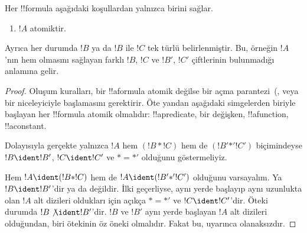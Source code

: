\begin{prop}
Her !!{formula} aşağıdaki koşullardan yalnızca birini sağlar.
\begin{enumerate}
\item $!A$ atomiktir.







\end{enumerate}
Ayrıca her durumda $!B$ ya da $!B$ ile $!C$ tek türlü belirlenmiştir.
Bu, örneğin $!A$'nın hem
 {
     {
      }}
olmasını sağlayan farklı $!B$, $!C$ ve $!B'$, $!C'$ çiftlerinin
bulunmadığı anlamına gelir.
\end{prop}

\begin{proof}
Oluşum kuralları, bir !!a{formula} atomik değilse bir açma
parantezi~(,  veya bir niceleyiciyle başlamasını
gerektirir. Öte yandan aşağıdaki simgelerden biriyle başlayan her
!!{formula} atomik olmalıdır: !!a{predicate}, bir değişken,
!!a{function}, !!a{constant}.

Dolayısıyla gerçekte yalnızca $!A$ hem $(!B \ast !C)$ hem de $(!B'
\mathbin{\ast'} !C')$ biçimindeyse $!B \ident !B'$, $!C \ident !C'$ ve
$\ast = {\ast'}$ olduğunu göstermeliyiz.

Hem $!A \ident (!B \ast !C)$ hem de $!A \ident (!B'
\mathbin{\ast'} !C')$ olduğunu varsayalım. Ya $!B \ident !B'$'dir ya
da değildir. İlki geçerliyse, aynı yerde başlayıp aynı uzunlukta olan
$!A$ alt dizileri oldukları için açıkça $\ast = {\ast'}$ ve
$!C \ident !C'$'dir. Öteki durumda $!B \not\ident !B'$'dir. $!B$ ve
$!B'$ aynı yerde başlayan $!A$ alt dizileri olduğundan, biri ötekinin
öz öneki olmalıdır. Fakat bu,  uyarınca olanaksızdır.
\end{proof}


